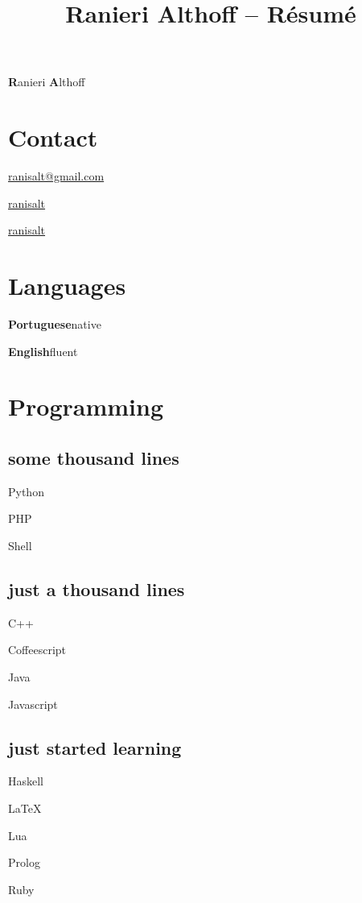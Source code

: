\documentclass{article}
\newcommand{\contactentry}[2]{%
	\parbox{\textwidth}{\hfill #2 \hspace{1em}\null}
}
\newcommand{\languageentry}[2]{%
	\parbox{\textwidth}{\hfill \textbf{#1}\hspace{1em}#2\hspace{1em}\null}
}
\newenvironment{aside}{%
\noindent
\begin{minipage}[t]{\dimexpr0.25\textwidth}%
\begin{flushright}%
\let\oldsection\section
\let\oldsubsection\subsection
\renewcommand{\section}[1]{\oldsection*{##1}}
\renewcommand{\subsection}[1]{\oldsubsection*{\small ##1}\vspace{-0.5em}}
}{%
\let\subsection\oldsubsection
\let\section\oldsection
\end{flushright}%
\end{minipage}%
}
\begin{document}
 \selectfont

\title{Ranieri Althoff -- Résumé}

\hfill \Huge \textbf{R}anieri \textbf{A}lthoff
\normalsize \par
\vspace{\fill}

\begin{aside}
\section{Contact}
\contactentry{email}{\href{mailto:ranisalt+cv@gmail.com}{ranisalt@gmail.com}}
\contactentry{github}{\href{https://github.com/ranisalt}{ranisalt}}
\contactentry{twitter}{\href{https://twitter.com/ranisalt}{ranisalt}}


\section{Languages}
\languageentry{Portuguese}{native}
\languageentry{English}{fluent}


\section{Programming}
\center
\subsection{some thousand lines}
\begin{itemize*}
\item{Python}
\item{PHP}
\item{Shell}
\end{itemize*}

\subsection{just a thousand lines}
\begin{itemize*}
\item{C++}
\item{Coffeescript}
\item{Java}
\item{Javascript}
\end{itemize*}

\subsection{just started learning}
\begin{itemize*}
\item{Haskell}
\item{\LaTeX}
\item{Lua}
\item{Prolog}
\item{Ruby}
\end{itemize*}


\end{aside}
\end{document}
